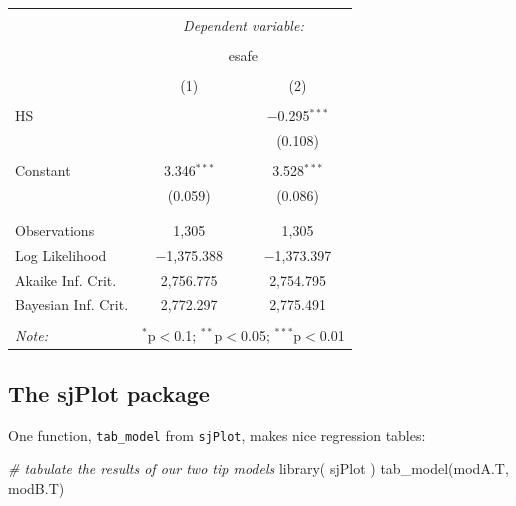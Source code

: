 \documentclass[
  letterpaper,
  DIV=11,
  numbers=noendperiod]{scrreprt}
\newenvironment{Shaded}{}{}
\newcommand{\CommentTok}[1]{\textcolor[rgb]{0.38,0.63,0.69}{\textit{#1}}}
\newcommand{\FunctionTok}[1]{\textcolor[rgb]{0.02,0.16,0.49}{#1}}
\newcommand{\NormalTok}[1]{#1}
\begin{document}
\begin{table}[!htbp] \centering 
  \caption{} 
  \label{} 
\begin{tabular}{@{\extracolsep{5pt}}lcc} 
\\[-1.8ex]\hline 
\hline \\[-1.8ex] 
 & \multicolumn{2}{c}{\textit{Dependent variable:}} \\ 
\cline{2-3} 
\\[-1.8ex] & \multicolumn{2}{c}{esafe} \\ 
\\[-1.8ex] & (1) & (2)\\ 
\hline \\[-1.8ex] 
 HS &  & $-$0.295$^{***}$ \\ 
  &  & (0.108) \\ 
  & & \\ 
 Constant & 3.346$^{***}$ & 3.528$^{***}$ \\ 
  & (0.059) & (0.086) \\ 
  & & \\ 
\hline \\[-1.8ex] 
Observations & 1,305 & 1,305 \\ 
Log Likelihood & $-$1,375.388 & $-$1,373.397 \\ 
Akaike Inf. Crit. & 2,756.775 & 2,754.795 \\ 
Bayesian Inf. Crit. & 2,772.297 & 2,775.491 \\ 
\hline 
\hline \\[-1.8ex] 
\textit{Note:}  & \multicolumn{2}{r}{$^{*}$p$<$0.1; $^{**}$p$<$0.05; $^{***}$p$<$0.01} \\ 
\end{tabular} 
\end{table}

\subsection{The sjPlot package}\label{the-sjplot-package}

One function, \texttt{tab\_model} from \texttt{sjPlot}, makes nice
regression tables:

\begin{Shaded}
\begin{Highlighting}[]
\CommentTok{\# tabulate the results of our two tip models}
\FunctionTok{library}\NormalTok{( sjPlot )}
\FunctionTok{tab\_model}\NormalTok{(modA.T, modB.T)}
\end{Highlighting}
\end{Shaded}
\end{document}
